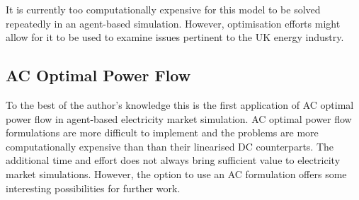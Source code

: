 
It is currently too computationally expensive for this model to be solved
repeatedly in an agent-based simulation.  However, optimisation efforts might
allow for it to be used to examine issues pertinent to the UK energy industry.


\subsection{AC Optimal Power Flow}
To the best of the author's knowledge this is the first application of AC
optimal power flow in agent-based electricity market simulation.  AC optimal
power flow formulations are more difficult to implement and the problems are
more computationally expensive than than their linearised DC counterparts.  The
additional time and effort does not always bring sufficient value to
electricity market simulations.  However, the option to use an AC formulation
offers some interesting possibilities for further work.

